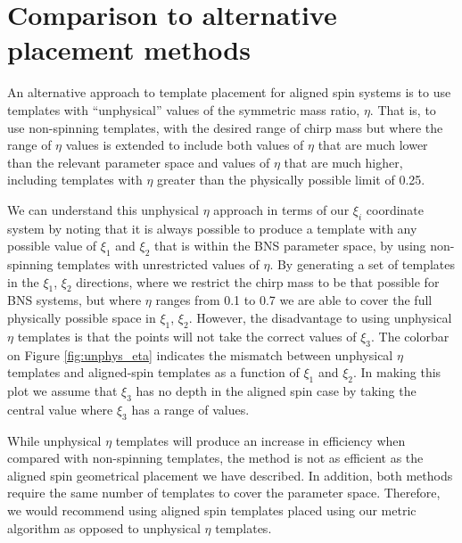 \section{Comparison to alternative placement methods}

An alternative approach to template placement for aligned spin systems is to use templates
with ``unphysical'' values of the symmetric mass ratio, $\eta$.
That is, to use non-spinning templates, with the desired range of chirp
mass but where the range of $\eta$ values is extended to include both values of $\eta$ that are much lower than
the relevant parameter space and values of $\eta$ that are much higher,
including templates with $\eta$ greater than the physically possible limit of 0.25.

We can understand this unphysical $\eta$ approach in terms of our $\xi_i$ coordinate system by noting that
it is always possible to produce a template with any possible value
of $\xi_1$ and $\xi_2$ that is within the BNS parameter space, by using non-spinning templates
with unrestricted values of $\eta$.
By generating a set of templates in the $\xi_1$, $\xi_2$ directions,
where we restrict the chirp mass to be that possible for BNS systems, but where $\eta$
ranges from 0.1 to 0.7 we are able to cover the full physically possible space in $\xi_1$, $\xi_2$. However,
the disadvantage to using unphysical $\eta$ templates is that the points will not take the correct values
of $\xi_3$. The colorbar on Figure \ref{fig:unphys_eta} indicates the mismatch between unphysical $\eta$ templates and
aligned-spin templates as a function of $\xi_1$ and $\xi_2$. In making this plot we assume that $\xi_3$
has no depth in the aligned spin case by taking the central value where $\xi_3$ has a range of values.

While unphysical $\eta$ templates will produce an increase in efficiency when compared with non-spinning templates, the
method is not as efficient as the aligned spin geometrical placement we have described. In addition, both methods
require the same number of templates to cover the parameter space. Therefore, we would recommend using aligned spin templates
placed using our metric algorithm as opposed to unphysical $\eta$ templates.

